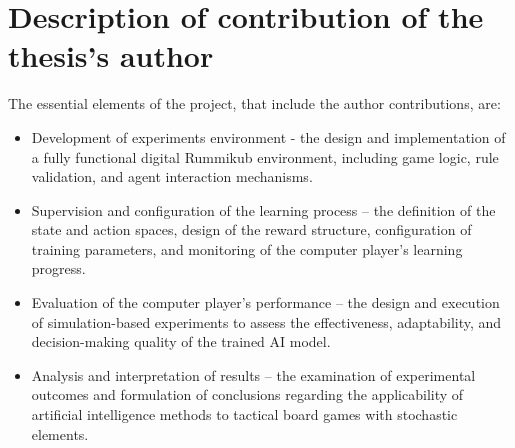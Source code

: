 \section{Description of contribution of the thesis's author}
The essential elements of the project, that include the author contributions, are:
 \begin{itemize}
 	\item Development of experiments environment - the design and implementation of a fully functional digital Rummikub environment, including game logic, rule validation, and agent interaction mechanisms.
 	\item Supervision and configuration of the learning process – the definition of the state and action spaces, design of the reward structure, configuration of training parameters, and monitoring of the computer player's learning progress.
 	\item Evaluation of the computer player's performance – the design and execution of simulation-based experiments to assess the effectiveness, adaptability, and decision-making quality of the trained AI model.
 	\item Analysis and interpretation of results – the examination of experimental outcomes and formulation of conclusions regarding the applicability of artificial intelligence methods to tactical board games with stochastic elements.
 \end{itemize}

